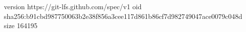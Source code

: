 version https://git-lfs.github.com/spec/v1
oid sha256:b91cbd987750063b2e38f856a3cee117d861b86cf7d982749047ace0079c048d
size 164195
